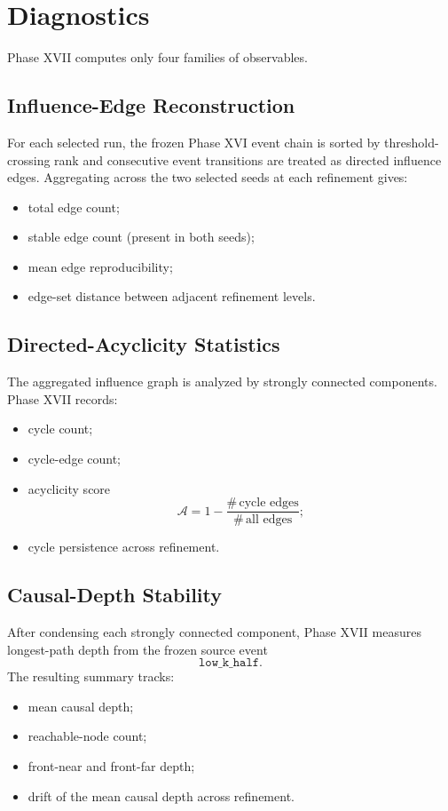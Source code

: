 \documentclass[11pt]{article}
\begin{document}
\section{Diagnostics}

Phase XVII computes only four families of observables.

\subsection{Influence-Edge Reconstruction}

For each selected run, the frozen Phase XVI event chain is sorted by threshold-crossing rank and consecutive event transitions are treated as directed influence edges. Aggregating across the two selected seeds at each refinement gives:
\begin{itemize}
\item total edge count;
\item stable edge count (present in both seeds);
\item mean edge reproducibility;
\item edge-set distance between adjacent refinement levels.
\end{itemize}

\subsection{Directed-Acyclicity Statistics}

The aggregated influence graph is analyzed by strongly connected components. Phase XVII records:
\begin{itemize}
\item cycle count;
\item cycle-edge count;
\item acyclicity score
\[
\mathcal{A}=1-\frac{\#\,\text{cycle edges}}{\#\,\text{all edges}};
\]
\item cycle persistence across refinement.
\end{itemize}

\subsection{Causal-Depth Stability}

After condensing each strongly connected component, Phase XVII measures longest-path depth from the frozen source event
\[
\texttt{low\_k\_half}.
\]
The resulting summary tracks:
\begin{itemize}
\item mean causal depth;
\item reachable-node count;
\item front-near and front-far depth;
\item drift of the mean causal depth across refinement.
\end{itemize}
\end{document}
